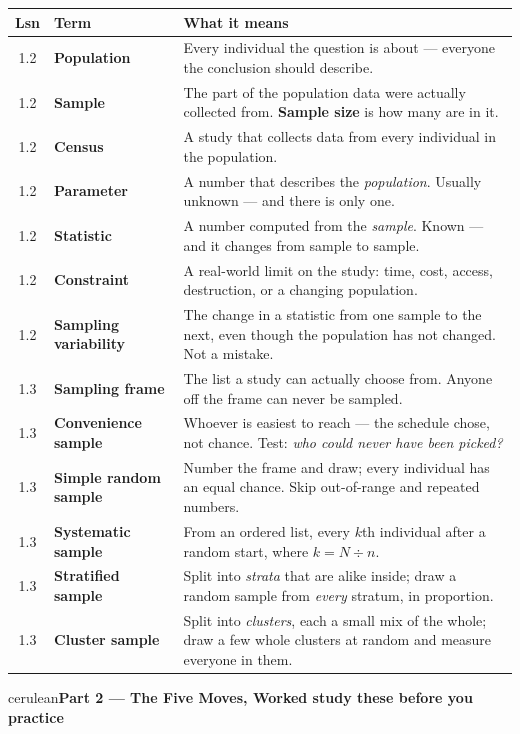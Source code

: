 \documentclass[10pt]{article}
\newcommand{\parthead}[1]{%
  \vspace{6pt}\noindent
  \begin{headlinebox}{cerulean}{\color{white}\bfseries #1}\end{headlinebox}%
  \vspace{4pt}}
\begin{document}
\vspace{4pt}
\boxguard[14]
\begin{tabularx}{\linewidth}{@{} c >{\bfseries}p{3.0cm} X @{}}
\rowcolor{frost}
\textbf{Lsn} & \textbf{Term} & \textbf{What it means} \\
\midrule
1.2 & Population & Every individual the question is about --- everyone the
      conclusion should describe. \\
1.2 & Sample & The part of the population data were actually collected from.
      \textbf{Sample size} is how many are in it. \\
1.2 & Census & A study that collects data from every individual in the
      population. \\
1.2 & Parameter & A number that describes the \emph{population}. Usually unknown
      --- and there is only one. \\
1.2 & Statistic & A number computed from the \emph{sample}. Known --- and it
      changes from sample to sample. \\
1.2 & Constraint & A real-world limit on the study: time, cost, access,
      destruction, or a changing population. \\
1.2 & Sampling variability & The change in a statistic from one sample to the
      next, even though the population has not changed. Not a mistake. \\
1.3 & Sampling frame & The list a study can actually choose from. Anyone off the
      frame can never be sampled. \\
1.3 & Convenience sample & Whoever is easiest to reach --- the schedule chose,
      not chance. Test: \emph{who could never have been picked?} \\
1.3 & Simple random sample & Number the frame and draw; every individual has an
      equal chance. Skip out-of-range and repeated numbers. \\
1.3 & Systematic sample & From an ordered list, every $k$th individual after a
      random start, where $k = N \div n$. \\
1.3 & Stratified sample & Split into \emph{strata} that are alike inside; draw a
      random sample from \emph{every} stratum, in proportion. \\
1.3 & Cluster sample & Split into \emph{clusters}, each a small mix of the whole;
      draw a few whole clusters at random and measure everyone in them. \\
\end{tabularx}
\normalsize

\vspace{4pt}
\boxguard[14]
\parthead{Part 2 --- The Five Moves, Worked \hfill study these before you practice}
\end{document}
